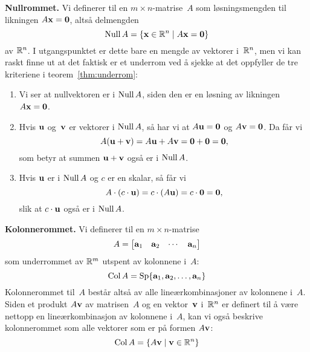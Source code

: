 \medskip\noindent\textbf{Nullrommet. }%
Vi definerer  til en $m \times n$-matrise~$A$ som
løsningsmengden til likningen $A \mathbf{x} = \mathbf{0}$, altså delmengden
\[
\operatorname{Null} A = \{ \mathbf{x} \in \mathbb{R}^n \mid A \mathbf{x} = \mathbf{0} \}
\]
av $\mathbb{R}^n$.  I utgangspunktet er dette bare en mengde av vektorer
i~$\mathbb{R}^n$, men vi kan raskt finne ut at det faktisk er et underrom ved
å sjekke at det oppfyller de tre kriteriene i teorem~\ref{thm:underrom}:
\begin{enumerate}
\item Vi ser at nullvektoren er i $\operatorname{Null} A$, siden den er en løsning
av likningen $A \mathbf{x} = \mathbf{0}$.
\item Hvis $\mathbf{u}$ og~$\mathbf{v}$ er vektorer i $\operatorname{Null} A$, så har vi at
$A \mathbf{u} = \mathbf{0}$ og $A \mathbf{v} = \mathbf{0}$.  Da får vi
\[
A (\mathbf{u} + \mathbf{v}) = A \mathbf{u} + A \mathbf{v} = \mathbf{0} + \mathbf{0} = \mathbf{0},
\]
som betyr at summen $\mathbf{u} + \mathbf{v}$ også er i $\operatorname{Null} A$.
\item Hvis $\mathbf{u}$ er i $\operatorname{Null} A$ og $c$ er en skalar, så får vi
\[
A \cdot (c \cdot \mathbf{u}) = c \cdot (A \mathbf{u}) = c \cdot \mathbf{0} = \mathbf{0},
\]
slik at $c \cdot \mathbf{u}$ også er i $\operatorname{Null} A$.
\end{enumerate}

\medskip\noindent\textbf{Kolonnerommet. }%
Vi definerer  til en $m \times n$-matrise
\[
A = \begin{bmatrix} \mathbf{a}_1 & \mathbf{a}_2 & \cdots & \mathbf{a}_n \end{bmatrix}
\]
som underrommet av $\mathbb{R}^m$ utspent av kolonnene i~$A$:
\[
\operatorname{Col} A = \operatorname{Sp} \{ \mathbf{a}_1, \mathbf{a}_2, \ldots, \mathbf{a}_n \}
\]
Kolonnerommet til~$A$ består altså av alle lineærkombinasjoner av
kolonnene i~$A$.  Siden et produkt $A \mathbf{v}$ av matrisen~$A$ og en
vektor~$\mathbf{v}$ i~$\mathbb{R}^n$ er definert til å være nettopp en
lineærkombinasjon av kolonnene i~$A$, kan vi også beskrive
kolonnerommet som alle vektorer som er på formen $A \mathbf{v}$:
\[
\operatorname{Col} A = \{ A \mathbf{v} \mid \mathbf{v} \in \mathbb{R}^n \}
\]



\kapittelslutt
